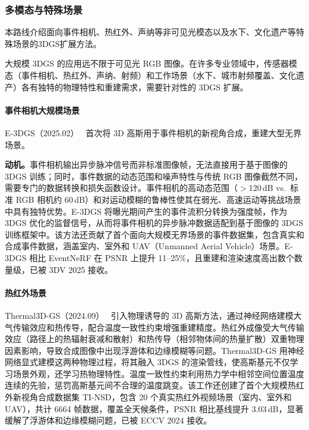 \subsubsection{多模态与特殊场景}

本路线介绍面向事件相机、热红外、声纳等非可见光模态以及水下、文化遗产等特殊场景的3DGS扩展方法。

大规模 3DGS 的应用远不限于可见光 RGB 图像。在许多专业领域中，传感器模态（事件相机、热红外、声纳、射频）和工作场景（水下、城市射频覆盖、文化遗产）各有独特的物理特性和重建需求，需要针对性的 3DGS 扩展。

\paragraph{事件相机大规模场景}

E-3DGS（2025.02）~\cite{2502_10827} 首次将 3D 高斯用于事件相机的新视角合成，重建大型无界场景。

\textbf{动机。}事件相机输出异步脉冲信号而非标准图像帧，无法直接用于基于图像的 3DGS 训练；同时，事件数据的动态范围和噪声特性与传统 RGB 图像截然不同，需要专门的数据转换和损失函数设计。事件相机的高动态范围（$>$120\,dB vs.\ 标准 RGB 相机约 60\,dB）和对运动模糊的鲁棒性使其在弱光、高速运动等挑战场景中具有独特优势。E-3DGS 将曝光期间产生的事件流积分转换为强度帧，作为 3DGS 优化的监督信号，从而将事件相机的异步脉冲数据适配到基于图像的 3DGS 训练框架中。该方法还贡献了首个面向大规模无界场景的事件数据集，包含真实和合成事件数据，涵盖室内、室外和 UAV（Unmanned Aerial Vehicle）场景。E-3DGS 相比 EventNeRF 在 PSNR 上提升 11--25\%，且重建和渲染速度高出数个数量级，已被 3DV 2025 接收。

\paragraph{热红外场景}

Thermal3D-GS（2024.09）~\cite{2409_08042} 引入物理诱导的 3D 高斯方法，通过神经网络建模大气传输效应和热传导，配合温度一致性约束增强重建精度。热红外成像受大气传输效应（路径上的热辐射衰减和散射）和热传导（相邻物体间的热量扩散）双重物理因素影响，导致合成图像中出现浮游体和边缘模糊等问题。Thermal3D-GS 用神经网络显式建模这两种物理过程，将其融入 3DGS 的渲染管线，使高斯基元不仅学习场景外观，还学习热物理特性。温度一致性约束利用热力学中相邻空间位置温度连续的先验，惩罚高斯基元间不合理的温度跳变。该工作还创建了首个大规模热红外新视角合成数据集 TI-NSD，包含 20 个真实热红外视频场景（室内、室外和 UAV），共计 6664 帧数据，覆盖全天候条件，PSNR 相比基线提升 3.03\,dB，显著缓解了浮游体和边缘模糊问题，已被 ECCV 2024 接收。

